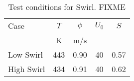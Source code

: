 \begin{table}
  \caption[Test conditions for Swirl]{Test conditions for Swirl. FIXME}
  \begin{center}
    \begin{tabular}{lcccc}
      Case & \(T\) & \(\phi\) & \(U_0\) & \(S\) \tabularnewline
      & K & m/s & & \tabularnewline
      \hline\hline
      Low Swirl & 443 & 0.90 & 40 & 0.57 \tabularnewline
      High Swirl & 434 & 0.91 & 40 & 0.62 \tabularnewline
      \hline
    \end{tabular}
  \end{center}
  \label{tab:swirlCases}
\end{table}

